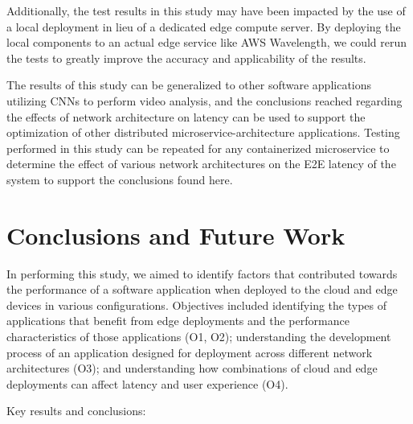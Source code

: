 \documentclass[11pt]{article}
\begin{document}
Additionally, the test results in this study may have been impacted by the use of a local deployment
in lieu of a dedicated edge compute server. By deploying the local components to an actual edge
service like AWS Wavelength, we could rerun the tests to greatly improve the accuracy and applicability
of the results.\newline

The results of this study can be generalized to other software applications utilizing CNNs to perform
video analysis, and the conclusions reached regarding the effects of network architecture
on latency can be used to support the optimization of other distributed microservice-architecture 
applications. Testing performed in this study can be repeated for any containerized microservice 
to determine the effect of various network architectures on the E2E latency of the system to 
support the conclusions found here.

\newpage
\section{Conclusions and Future Work}
In performing this study, we aimed to identify factors that contributed towards the performance
of a software application when deployed to the cloud and edge devices in various configurations.
Objectives included identifying the types of applications that benefit from edge deployments and
the performance characteristics of those applications (O1, O2); understanding the development
process of an application designed for deployment across different network architectures (O3); and
understanding how combinations of cloud and edge deployments can affect latency and user experience (O4).
\newline

Key results and conclusions:
\end{document}
